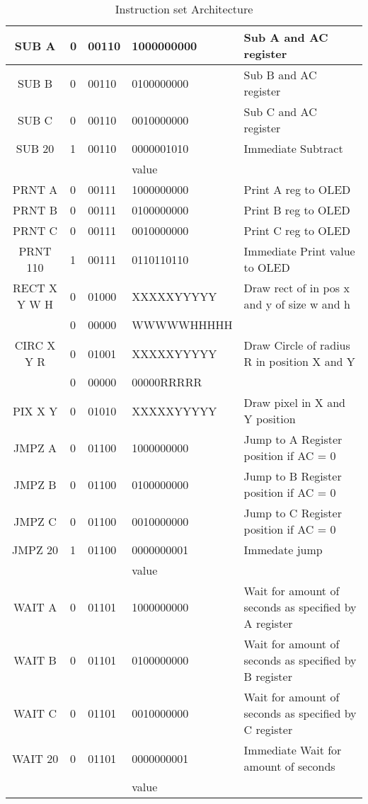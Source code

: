 \documentclass[a4paper,12pt]{article}
\begin{document}
\begin{table}[H]
{\begin{tabular}{|c|l|l|l|p{6cm}|}
    SUB A & 0 & 00110 & 1000000000 & Sub A and AC register\\ \hline
    SUB B & 0 & 00110 & 0100000000 & Sub B and AC register\\ \hline
    SUB C & 0 & 00110 & 0010000000 & Sub C and AC register\\ \hline
    SUB 20 & 1 & 00110 & 0000001010 & Immediate Subtract\\ 
    &  &  & value  & \\ \hline
    PRNT A & 0 & 00111 & 1000000000 & Print A reg to OLED \\ \hline
    PRNT B & 0 & 00111 & 0100000000 & Print B reg to OLED \\ \hline
    PRNT C & 0 & 00111 & 0010000000 & Print C reg to OLED\\ \hline
    PRNT 110 & 1 & 00111 & 0110110110 & Immediate Print value to OLED\\ \hline
    RECT X Y W H & 0 & 01000 & XXXXXYYYYY & Draw rect of in pos x and y of size w and h\\ 
    & 0 & 00000 & WWWWWHHHHH &\\ \hline 
    CIRC X Y R & 0 & 01001 & XXXXXYYYYY & Draw Circle of radius R in position X and Y\\ 
    & 0 & 00000 & 00000RRRRR & \\ \hline
    PIX X Y & 0 & 01010 & XXXXXYYYYY & Draw pixel in X and Y position\\ \hline
    JMPZ A & 0 & 01100 & 1000000000 & Jump to A Register position if AC = 0\\ \hline
    JMPZ B & 0 & 01100 & 0100000000 & Jump to B Register position if AC = 0\\ \hline
    JMPZ C & 0 & 01100 & 0010000000 & Jump to C Register position if AC = 0\\ \hline
    JMPZ 20 & 1 & 01100 & 0000000001 & Immedate jump \\ 
    &  &  & value  & \\ \hline
    WAIT A & 0 & 01101 & 1000000000 & Wait for amount of seconds as specified by A register\\ \hline
    WAIT B & 0 & 01101 & 0100000000 &  Wait for amount of seconds as specified by B register\\ \hline
    WAIT C & 0 & 01101 & 0010000000 &  Wait for amount of seconds as specified by C register\\ \hline
    WAIT 20 & 0 & 01101 & 0000000001 &  Immediate Wait for amount of seconds \\ 
    &  &  & value  & \\ \hline
    \end{tabular}
    }
    \caption{Instruction set Architecture}
    \end{table}
\end{document}
